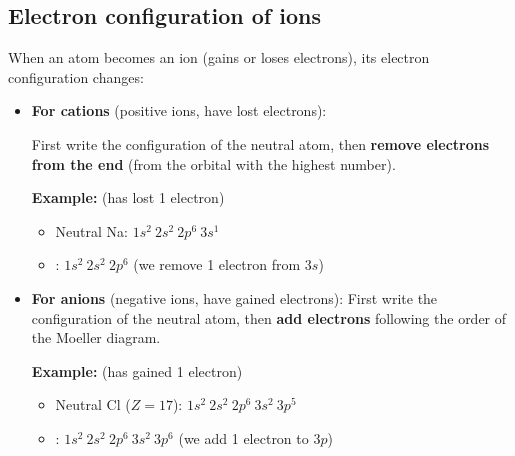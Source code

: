 \subsection{Electron configuration of ions}
When an atom becomes an ion (gains or loses electrons), its electron configuration changes:
\begin{itemize}
    \item \textbf{For cations} (positive ions, have lost electrons):

    First write the configuration of the neutral atom, then \textbf{remove electrons from the end} (from the orbital with the highest number).

    \textbf{Example:}  (has lost 1 electron)
    \begin{itemize}
        \item Neutral Na: \( 1s^2\ 2s^2\ 2p^6\ 3s^1 \)
        \item {}: \( 1s^2\ 2s^2\ 2p^6 \) (we remove 1 electron from \( 3s \))
    \end{itemize}

    \item \textbf{For anions} (negative ions, have gained electrons):
    First write the configuration of the neutral atom, then \textbf{add electrons} following the order of the Moeller diagram.

    \textbf{Example:}  (has gained 1 electron)
    \begin{itemize}
        \item Neutral Cl (\( Z = 17 \)): \( 1s^2\ 2s^2\ 2p^6\ 3s^2\ 3p^5 \)
        \item {}: \( 1s^2\ 2s^2\ 2p^6\ 3s^2\ 3p^6 \) (we add 1 electron to \( 3p \))
    \end{itemize}
\end{itemize}

